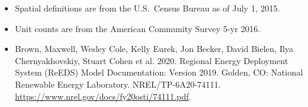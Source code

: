 \begin{itemize}
\item Spatial definitions are from the U.S.~Census Bureau as of July 1, 2015.
\item Unit counts are from the American Community Survey 5-yr 2016.
\item Brown, Maxwell, Wesley Cole, Kelly Eurek, Jon Becker, David Bielen, Ilya Chernyakhovskiy, Stuart Cohen et al. 2020. Regional Energy Deployment System (ReEDS) Model Documentation: Version 2019. Golden, CO: National Renewable Energy Laboratory. NREL/TP-6A20-74111. \href{https://www.nrel.gov/docs/fy20osti/74111.pdf}{https://www.nrel.gov/docs/fy20osti/74111.pdf}.
\end{itemize}
